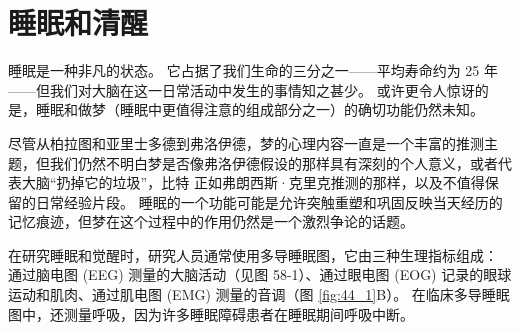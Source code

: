 \chapter{睡眠和清醒} \label{chap:chap44}

睡眠是一种非凡的状态。
它占据了我们生命的三分之一——平均寿命约为 25 年——但我们对大脑在这一日常活动中发生的事情知之甚少。
或许更令人惊讶的是，睡眠和做梦（睡眠中更值得注意的组成部分之一）的确切功能仍然未知。


尽管从柏拉图和亚里士多德到弗洛伊德，梦的心理内容一直是一个丰富的推测主题，但我们仍然不明白梦是否像弗洛伊德假设的那样具有深刻的个人意义，或者代表大脑“扔掉它的垃圾”，比特 正如弗朗西斯·克里克推测的那样，以及不值得保留的日常经验片段。
睡眠的一个功能可能是允许突触重塑和巩固反映当天经历的记忆痕迹，但梦在这个过程中的作用仍然是一个激烈争论的话题。


在研究睡眠和觉醒时，研究人员通常使用多导睡眠图，它由三种生理指标组成：
通过脑电图 (EEG) 测量的大脑活动（见图 58-1）、通过眼电图 (EOG) 记录的眼球运动和肌肉、通过肌电图 (EMG) 测量的音调（图 \ref{fig:44_1}B）。 
在临床多导睡眠图中，还测量呼吸，因为许多睡眠障碍患者在睡眠期间呼吸中断。


